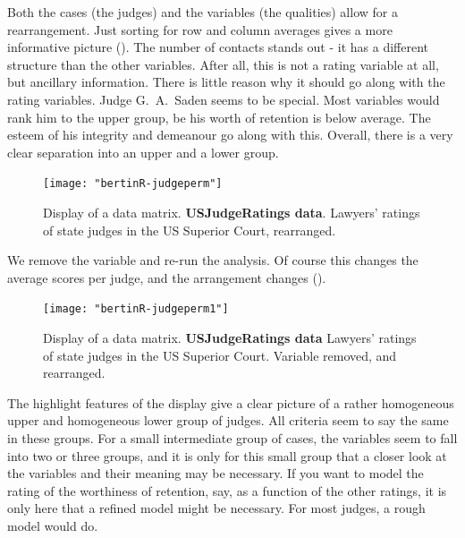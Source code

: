 \documentclass[nogin, dvips,12pt,a4paper,twoside]{amsart}
\begin{document}
Both the cases (the judges) and the variables (the qualities) allow for a rearrangement. Just sorting for row and column averages gives a more informative picture  (). The number of contacts  stands out - it has a different structure than the other variables. After all, this is not a rating variable at all, but ancillary information. There is little reason why it should go along with the rating variables. Judge G.~A.~Saden seems to be special. Most variables would rank him to the upper group, be his worth of retention is below average. The esteem of his integrity and demeanour go along with this. Overall, there is a very clear separation into an upper and a lower group.



%
\begin{figure}[htbp]
\begin{center}
\texttt{[image: "bertinR-judgeperm"]}
\caption{Display of a data matrix. \textbf{USJudgeRatings data}. Lawyers' ratings of state judges in the US Superior Court, rearranged.}
\label{fig:judgeperm}
\end{center}
\end{figure}

We remove the variable  and re-run the analysis. Of course this changes the average scores per judge, and the arrangement changes ().

\begin{figure}[htbp]
\begin{center}
\texttt{[image: "bertinR-judgeperm1"]}
\caption{Display of a data matrix. \textbf{USJudgeRatings data} Lawyers' ratings of state judges in the US Superior Court. Variable  removed, and rearranged.}
\label{fig:judgeperm1}
\end{center}
\end{figure}

The highlight features of the  display give a clear picture of a rather homogeneous upper and homogeneous lower group of judges. All criteria seem to say the same in these groups. For a small intermediate group of cases, the variables seem to fall into two or three groups, and it is only for this small group that a closer look at the variables and their meaning may be necessary. 
 If you want to model the rating of the worthiness of retention, say, as a function of the other ratings, it is only here that a refined model might be necessary. For most judges, a rough model would do.
 
\end{document}
